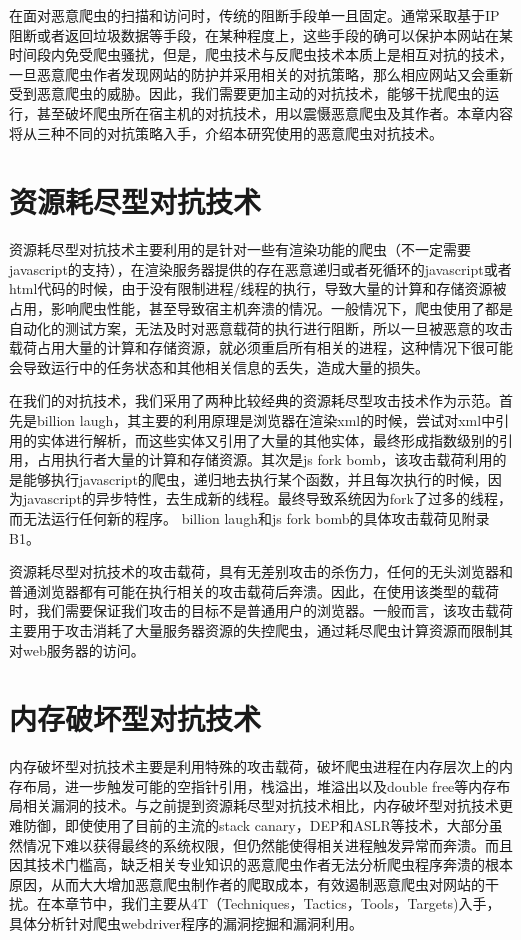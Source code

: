 \documentclass[doctor,privacy,twoside]{buaa_mac}
\begin{document}
在面对恶意爬虫的扫描和访问时，传统的阻断手段单一且固定。通常采取基于IP阻断或者返回垃圾数据等手段，在某种程度上，这些手段的确可以保护本网站在某时间段内免受爬虫骚扰，但是，爬虫技术与反爬虫技术本质上是相互对抗的技术，一旦恶意爬虫作者发现网站的防护并采用相关的对抗策略，那么相应网站又会重新受到恶意爬虫的威胁。因此，我们需要更加主动的对抗技术，能够干扰爬虫的运行，甚至破坏爬虫所在宿主机的对抗技术，用以震慑恶意爬虫及其作者。本章内容将从三种不同的对抗策略入手，介绍本研究使用的恶意爬虫对抗技术。

\section{资源耗尽型对抗技术}
资源耗尽型对抗技术主要利用的是针对一些有渲染功能的爬虫（不一定需要javascript的支持），在渲染服务器提供的存在恶意递归或者死循环的javascript或者html代码的时候，由于没有限制进程/线程的执行，导致大量的计算和存储资源被占用，影响爬虫性能，甚至导致宿主机奔溃的情况。一般情况下，爬虫使用了都是自动化的测试方案，无法及时对恶意载荷的执行进行阻断，所以一旦被恶意的攻击载荷占用大量的计算和存储资源，就必须重启所有相关的进程，这种情况下很可能会导致运行中的任务状态和其他相关信息的丢失，造成大量的损失。

在我们的对抗技术，我们采用了两种比较经典的资源耗尽型攻击技术作为示范。首先是billion laugh，其主要的利用原理是浏览器在渲染xml的时候，尝试对xml中引用的实体进行解析，而这些实体又引用了大量的其他实体，最终形成指数级别的引用，占用执行者大量的计算和存储资源。其次是js fork bomb，该攻击载荷利用的是能够执行javascript的爬虫，递归地去执行某个函数，并且每次执行的时候，因为javascript的异步特性，去生成新的线程。最终导致系统因为fork了过多的线程，而无法运行任何新的程序。 billion laugh和js fork bomb的具体攻击载荷见附录B1。

资源耗尽型对抗技术的攻击载荷，具有无差别攻击的杀伤力，任何的无头浏览器和普通浏览器都有可能在执行相关的攻击载荷后奔溃。因此，在使用该类型的载荷时，我们需要保证我们攻击的目标不是普通用户的浏览器。一般而言，该攻击载荷主要用于攻击消耗了大量服务器资源的失控爬虫，通过耗尽爬虫计算资源而限制其对web服务器的访问。


\section{内存破坏型对抗技术}
内存破坏型对抗技术主要是利用特殊的攻击载荷，破坏爬虫进程在内存层次上的内存布局，进一步触发可能的空指针引用，栈溢出，堆溢出以及double free等内存布局相关漏洞的技术。与之前提到资源耗尽型对抗技术相比，内存破坏型对抗技术更难防御，即使使用了目前的主流的stack canary，DEP和ASLR等技术，大部分虽然情况下难以获得最终的系统权限，但仍然能使得相关进程触发异常而奔溃。而且因其技术门槛高，缺乏相关专业知识的恶意爬虫作者无法分析爬虫程序奔溃的根本原因，从而大大增加恶意爬虫制作者的爬取成本，有效遏制恶意爬虫对网站的干扰。在本章节中，我们主要从4T（Techniques，Tactics，Tools，Targets)入手，具体分析针对爬虫webdriver程序的漏洞挖掘和漏洞利用。
\end{document}
